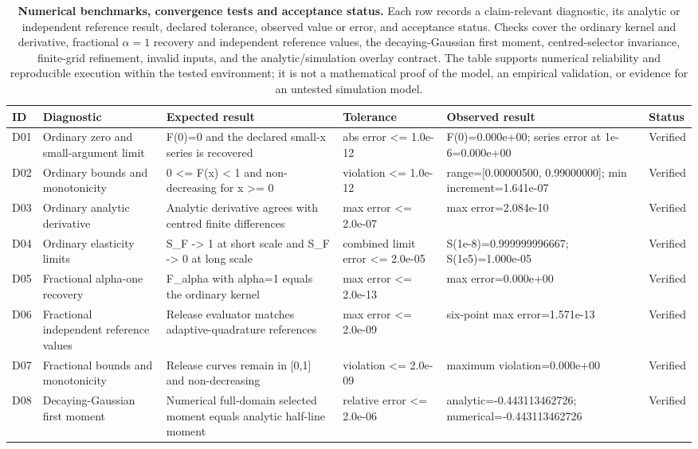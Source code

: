 \begin{table}[H]
\centering
\scriptsize
\caption{\textbf{Numerical benchmarks, convergence tests and acceptance status.} Each row records a claim-relevant diagnostic, its analytic or independent reference result, declared tolerance, observed value or error, and acceptance status. Checks cover the ordinary kernel and derivative, fractional $\alpha=1$ recovery and independent reference values, the decaying-Gaussian first moment, centred-selector invariance, finite-grid refinement, invalid inputs, and the analytic/simulation overlay contract. The table supports numerical reliability and reproducible execution within the tested environment; it is not a mathematical proof of the model, an empirical validation, or evidence for an untested simulation model.}
\label{tab:numerical-benchmarks}
\renewcommand{\arraystretch}{1.02}
\begin{tabularx}{\linewidth}{@{}p{0.9cm}p{3.6cm}X p{3.0cm}X p{1.8cm}@{}}
\toprule
ID & Diagnostic & Expected result & Tolerance & Observed result & Status \\
\midrule
D01 & Ordinary zero and small-argument limit & F(0)=0 and the declared small-x series is recovered & abs error <= 1.0e-12 & F(0)=0.000e+00; series error at 1e-6=0.000e+00 & Verified \\
D02 & Ordinary bounds and monotonicity & 0 <= F(x) < 1 and non-decreasing for x >= 0 & violation <= 1.0e-12 & range=[0.00000500, 0.99000000]; min increment=1.641e-07 & Verified \\
D03 & Ordinary analytic derivative & Analytic derivative agrees with centred finite differences & max error <= 2.0e-07 & max error=2.084e-10 & Verified \\
D04 & Ordinary elasticity limits & S\_F -> 1 at short scale and S\_F -> 0 at long scale & combined limit error <= 2.0e-05 & S(1e-8)=0.999999996667; S(1e5)=1.000e-05 & Verified \\
D05 & Fractional alpha-one recovery & F\_alpha with alpha=1 equals the ordinary kernel & max error <= 2.0e-13 & max error=0.000e+00 & Verified \\
D06 & Fractional independent reference values & Release evaluator matches adaptive-quadrature references & max error <= 2.0e-09 & six-point max error=1.571e-13 & Verified \\
D07 & Fractional bounds and monotonicity & Release curves remain in [0,1] and non-decreasing & violation <= 2.0e-09 & maximum violation=0.000e+00 & Verified \\
D08 & Decaying-Gaussian first moment & Numerical full-domain selected moment equals analytic half-line moment & relative error <= 2.0e-06 & analytic=-0.443113462726; numerical=-0.443113462726 & Verified \\

\end{tabularx}
\end{table}
